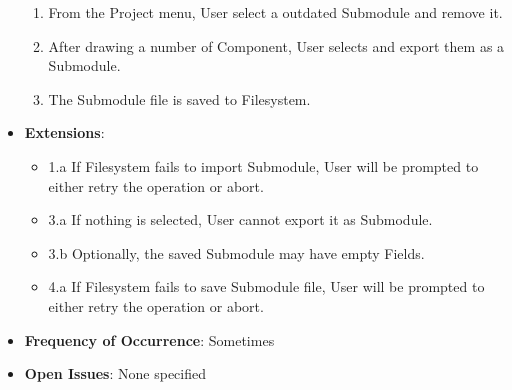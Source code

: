 \documentclass[12pt]{article}
\begin{document}
\begin{itemize}
\begin{enumerate}
            \item From the Project menu, User select a outdated Submodule and remove it.
            \item After drawing a number of Component, User selects and export them as a Submodule.
            \item The Submodule file is saved to Filesystem.
        \end{enumerate}
        \item \textbf{Extensions}:
        \begin{itemize}
            \item 1.a If Filesystem fails to import Submodule, User will be prompted to either retry the operation or abort.
            \item 3.a If nothing is selected, User cannot export it as Submodule.
            \item 3.b Optionally, the saved Submodule may have empty Fields.
            \item 4.a If Filesystem fails to save Submodule file, User will be prompted to either retry the operation or abort.
        \end{itemize}
        \item \textbf{Frequency of Occurrence}: Sometimes
        \item \textbf{Open Issues}: None specified
    \end{itemize}
\end{document}
